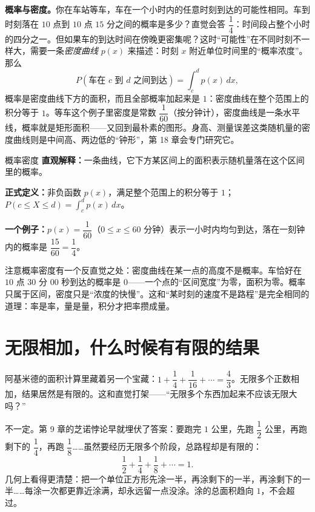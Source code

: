 \textbf{概率与密度。}你在车站等车，车在一个小时内的任意时刻到达的可能性相同。车到时刻落在 $10$ 点到 $10$ 点 $15$ 分之间的概率是多少？直觉会答 $\dfrac14$：时间段占整个小时的四分之一。但如果车的到达时间在傍晚更密集呢？这时“可能性”在不同时刻不一样大，需要一条\emph{密度曲线} $p(x)$ 来描述：时刻 $x$ 附近单位时间里的“概率浓度”。那么
\[
P(\text{车在 }c\text{ 到 }d\text{ 之间到达})=\int_c^d p(x)\,dx ,
\]
概率是密度曲线下方的面积，而且全部概率加起来是 $1$：密度曲线在整个范围上的积分等于 $1$。等车这个例子里密度是常数 $\dfrac{1}{60}$（按分钟计），密度曲线是一条水平线，概率就是矩形面积——又回到最朴素的图形。身高、测量误差这类随机量的密度曲线则是中间高、两边低的“钟形”，第 18 章会专门研究它。

\begin{shuyu}{概率密度}
\textbf{直观解释：}一条曲线，它下方某区间上的面积表示随机量落在这个区间里的概率。

\textbf{正式定义：}非负函数 $p(x)$，满足整个范围上的积分等于 $1$；$P(c\le X\le d)=\int_c^d p(x)\,dx$。

\textbf{一个例子：}$p(x)=\dfrac1{60}$（$0\le x\le 60$ 分钟）表示一小时内均匀到达，落在一刻钟内的概率是 $\dfrac{15}{60}=\dfrac14$。
\end{shuyu}

注意概率密度有一个反直觉之处：密度曲线在某一点的高度不是概率。车恰好在 $10$ 点 $30$ 分 $00$ 秒到达的概率是 $0$——一个点的“区间宽度”为零，面积为零。概率只属于区间，密度只是“浓度的快慢”。这和“某时刻的速度不是路程”是完全相同的道理：率是率，量是量，积分才把率攒成量。

\section{无限相加，什么时候有有限的结果}

阿基米德的面积计算里藏着另一个宝藏：$1+\dfrac14+\dfrac1{16}+\cdots=\dfrac43$。无限多个正数相加，结果居然是有限的。这和直觉打架——“无限多个东西加起来不应该无限大吗？”

不一定。第 9 章的芝诺悖论早就埋伏了答案：要跑完 $1$ 公里，先跑 $\dfrac12$ 公里，再跑剩下的 $\dfrac14$，再跑 $\dfrac18$……虽然要经历无限多个阶段，总路程却是有限的：
\[
\frac12+\frac14+\frac18+\cdots=1.
\]
几何上看得更清楚：把一个单位正方形先涂一半，再涂剩下的一半，再涂剩下的一半……每涂一次都更靠近涂满，却永远留一点没涂。涂的总面积趋向 $1$，不会超过。

\begin{center}
\end{center}

